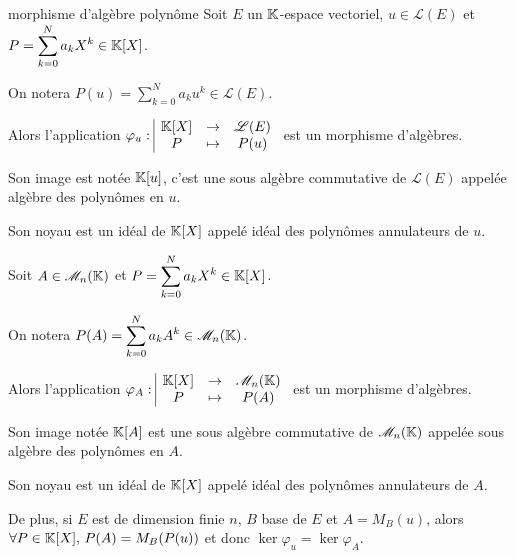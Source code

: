 \begin{theoreme}{morphisme d'algèbre polynôme}{}
    Soit $E$ un $\mathbb{K}$-espace vectoriel, $u \in \mathscr L(E)$ et 
    $P = \displaystyle \sum_{k = 0 }^{ N } a_k X^k \in \mathbb{K}[X]$.

    On notera $P(u) = \displaystyle \sum_{k = 0 }^{ N } a_k u^k \in \mathscr L(E)$.

    Alors l'application $\varphi_u: \space \begin{array}{|ccc} \displaystyle \mathbb{K}[X] & \to & \displaystyle \mathscr L(E) \\ \displaystyle P & \mapsto & \displaystyle P(u) \end{array}$ est un morphisme d'algèbres.

    Son image est notée $\mathbb{K}[u]$, c'est une sous algèbre commutative de $\mathscr L(E)$
    appelée algèbre des polynômes en $u$.

    Son noyau est un idéal de $\mathbb{K}[X]$ appelé idéal des polynômes annulateurs de $u$.

    \lvspace Soit $A \in \mathscr M_n(\mathbb{K})$ et $P = \displaystyle \sum_{k = 0 }^{ N } a_k X^k \in \mathbb{K}[X]$.

    On notera $P(A) = \displaystyle \sum_{k = 0 }^{ N } a_k A^k \in \mathscr M_n(\mathbb{K})$.

    Alors l'application $\varphi_A: \space \begin{array}{|ccc} \displaystyle \mathbb{K}[X] & \to & \displaystyle \mathscr M_n(\mathbb{K}) \\ \displaystyle P & \mapsto & \displaystyle P(A) \end{array}$ est un morphisme d'algèbres.

    Son image notée $\mathbb{K}[A]$ est une sous algèbre commutative de $\mathscr M_n(\mathbb{K})$ appelée 
    sous algèbre des polynômes en $A$.

    Son noyau est un idéal de $\mathbb{K}[X]$ appelé idéal des polynômes annulateurs de $A$.

    De plus, si $E$ est de dimension finie $n$, $B$ base de $E$ et $A = M_B(u)$, alors
    $\forall P \in \mathbb{K}[X], \, P(A) = M_B(P(u))$ et donc $\ker \varphi_u = \ker \varphi_A$.
\end{theoreme}

